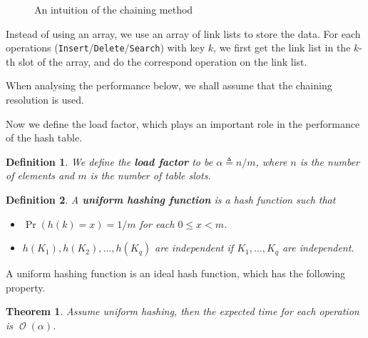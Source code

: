 \documentclass[12pt, a4paper]{article}
\newcommand{\ord}{\operatorname{\mathcal{O}}}
\newcommand{\defeq}{\triangleq}
\newtheorem{theorem}{Theorem}
\theoremstyle{mystyle} %
\newtheorem{definition}{Definition}
\begin{document}
\begin{figure}[H]
  \centering
  \caption{An intuition of the chaining method}
\end{figure}

Instead of using an array, we use an array of link lists to store the data.
For each operations (\texttt{Insert}/\texttt{Delete}/\texttt{Search})
with key $k$, we first get the link list in the $k$-th slot of the array,
and do the correspond operation on the link list.

When analysing the performance below, we shall assume that the chaining
resolution is used.
\medskip

Now we define the load factor, which plays an important role in the performance of the hash table. \smallskip
\begin{definition}
  We define the {\bf load factor} to be $\alpha \defeq n / m$, where $n$ is the number of elements
  and $m$ is the number of table slots.
\end{definition}

\begin{definition}
  A {\bf uniform hashing function} is a hash function such that
  \begin{itemize}
    \item $\Pr(h(k) = x) = 1/m$ for each $0 \leq x < m$.
    \item $h(K_1), h(K_2), \dots, h(K_q)$ are independent if $K_1, \dots, K_q$ are independent.
  \end{itemize}
\end{definition}

A uniform hashing function is an ideal hash function, which has the following property.
\smallskip

\begin{theorem} \label{thm:uniform-hashing-expected-time}
  Assume uniform hashing, then the expected time for each operation is $\ord(\alpha)$.
\end{theorem}
\end{document}
